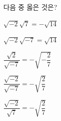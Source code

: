 다음 중 옳은 것은?
\begin{choicesii}{\rule[-3ex]{0pt}{8ex}$\sqrt{-2}\sqrt{7}=-\sqrt{14}$}{\rule[-3ex]{0pt}{8ex}$\sqrt{-2}\sqrt{-7}=\sqrt{14}$}{\rule[-3ex]{0pt}{8ex}$\dfrac{\sqrt{2}}{\sqrt{-7}}=-\sqrt{-\dfrac{2}{7}}$}{\rule[-3ex]{0pt}{8ex}$\dfrac{\sqrt{-2}}{\sqrt{-7}}=-\sqrt{\dfrac{2}{7}}$}{\rule[-3ex]{0pt}{8ex}$\dfrac{\sqrt{-2}}{\sqrt{7}}=-\sqrt{\dfrac{2}{7}}$}\end{choicesii}

